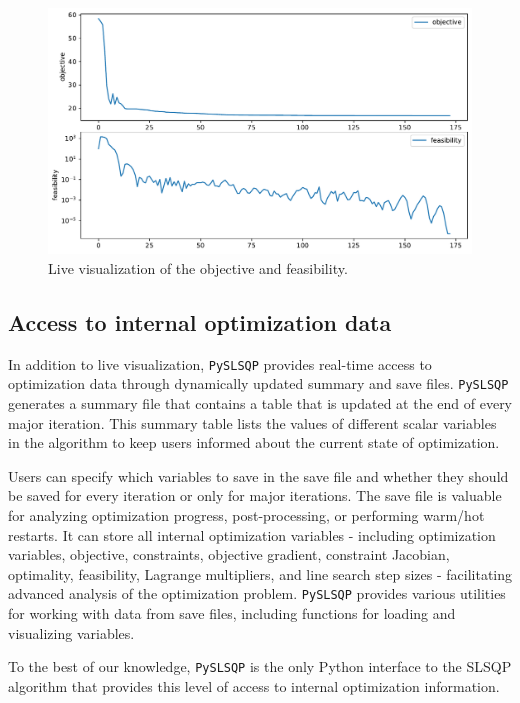 \documentclass[
]{article}
\begin{document}
\begin{figure}
\centering
\includegraphics{slsqp_plot.pdf}
\caption{Live visualization of the objective and feasibility.}
\end{figure}

\subsection{Access to internal optimization
data}\label{access-to-internal-optimization-data}

In addition to live visualization, \texttt{PySLSQP} provides real-time
access to optimization data through dynamically updated summary and save
files. \texttt{PySLSQP} generates a summary file that contains a table
that is updated at the end of every major iteration. This summary table
lists the values of different scalar variables in the algorithm to keep
users informed about the current state of optimization.

Users can specify which variables to save in the save file and whether
they should be saved for every iteration or only for major iterations.
The save file is valuable for analyzing optimization progress,
post-processing, or performing warm/hot restarts. It can store all
internal optimization variables - including optimization variables,
objective, constraints, objective gradient, constraint Jacobian,
optimality, feasibility, Lagrange multipliers, and line search step
sizes - facilitating advanced analysis of the optimization problem.
\texttt{PySLSQP} provides various utilities for working with data from
save files, including functions for loading and visualizing variables.

To the best of our knowledge, \texttt{PySLSQP} is the only Python
interface to the SLSQP algorithm that provides this level of access to
internal optimization information.
\end{document}
